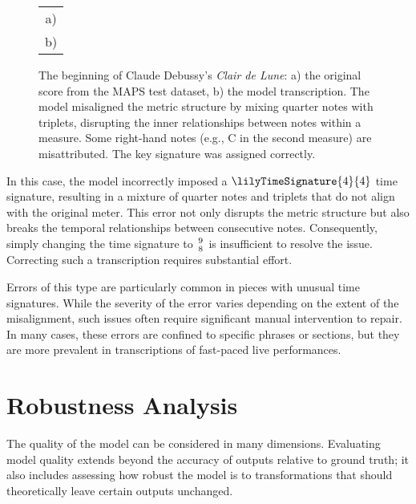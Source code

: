 \begin{figure}[ht!]
\centering \begin{tabular}{c}a)  \\ b)  \end{tabular} \caption[Claude Debussy's \emph{Clair de Lune}.]{The beginning of Claude Debussy's \emph{Clair de Lune}: a) the original score from the MAPS test dataset, b) the model transcription. The model misaligned the metric structure by mixing quarter notes with triplets, disrupting the inner relationships between notes within a measure. Some right-hand notes (e.g., C in the second measure) are misattributed. The key signature was assigned correctly.}
\label{claire_de_lune}
\end{figure}

In this case, the model incorrectly imposed a $\lilyTimeSignature{4}{4}$ time signature, resulting in a mixture of quarter notes and triplets that do not align with the original meter. This error not only disrupts the metric structure but also breaks the temporal relationships between consecutive notes. Consequently, simply changing the time signature to ${9 \atop 8}$ is insufficient to resolve the issue. Correcting such a transcription requires substantial effort.

Errors of this type are particularly common in pieces with unusual time signatures. While the severity of the error varies depending on the extent of the misalignment, such issues often require significant manual intervention to repair. In many cases, these errors are confined to specific phrases or sections, but they are more prevalent in transcriptions of fast-paced live performances.

\section{Robustness Analysis} \label{robustness_analysis}

The quality of the model can be considered in many dimensions. Evaluating model quality extends beyond the accuracy of outputs relative to ground truth; it also includes assessing how robust the model is to transformations that should theoretically leave certain outputs unchanged.

